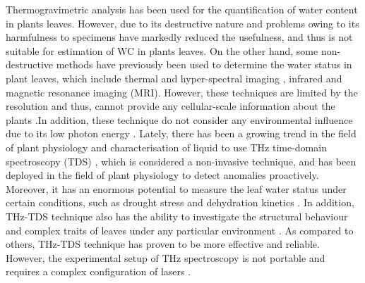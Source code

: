 \documentclass[preprints,article,accept,moreauthors,pdftex]{Definitions/mdpi}
\renewcommand{\^}{\hat}  %
\begin{document}
{Thermogravimetric analysis has been used for the quantification of water content in plants leaves. However, due to its destructive nature and problems owing to its harmfulness to specimens have markedly reduced the usefulness, and thus is not suitable for estimation of WC in plants leaves}. On the other hand, some non-destructive methods have previously been used to determine the water status in plant leaves, {which include thermal and hyper-spectral imaging \cite{Higa:13,Song2018}, infrared \cite{Sardans2010} and magnetic resonance imaging (MRI)\cite{Sarracanie2015}}. However, these techniques are limited by the resolution and thus, cannot provide any cellular-scale information about the plants {\cite{Song2018}}.In addition, these technique do not consider any environmental influence due to its low photon energy \cite{Song2018,Gente2015}. 
{Lately, there has been a growing trend in the field of plant physiology and characterisation of liquid to use THz time-domain spectroscopy (TDS) \cite{Gente,David2012}, which is considered a non-invasive technique, and has been deployed in the field of plant physiology to detect anomalies proactively. Moreover, it has an enormous potential to measure the leaf water status under certain conditions, such as drought stress \cite{Jordens2009,Gente,Born2014,Hadjiloucas1999,Ugo2012} and dehydration kinetics \cite{Song2018}. In addition, THz-TDS technique also has the ability to investigate the structural behaviour and complex traits of leaves under any particular environment \cite{Song2018,Gente2015}. As compared to others, THz-TDS technique has proven to be more effective and reliable. However, the experimental setup of THz spectroscopy is not portable and requires a complex configuration of lasers \cite{David2012}}.
% 
\end{document}
